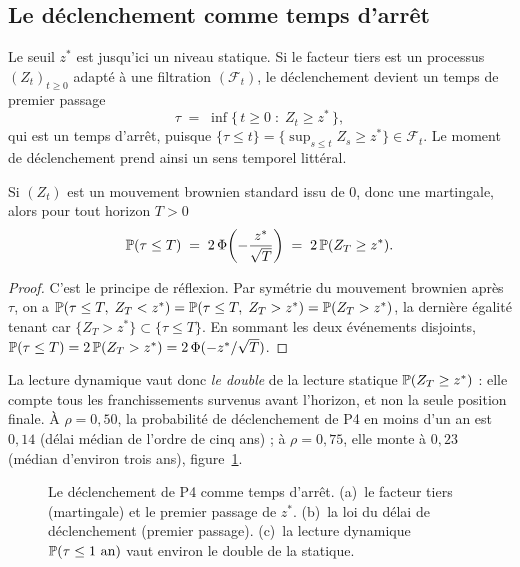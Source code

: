 \subsection{Le déclenchement comme temps d'arrêt}
\label{sec:p4-dynamique}

Le seuil $z^*$ est jusqu'ici un niveau statique. Si le facteur tiers est un processus
$(Z_t)_{t\ge0}$ adapté à une filtration $(\mathcal{F}_t)$, le déclenchement devient un
temps de premier passage
\begin{equation}
  \tau \;=\; \inf\{\,t\ge 0 \;:\; Z_t \ge z^*\,\},
  \label{eq:temps-arret}
\end{equation}
qui est un temps d'arrêt, puisque $\{\tau\le t\}=\{\sup_{s\le t}Z_s\ge z^*\}\in
\mathcal{F}_t$. Le \og{}moment\fg{} de déclenchement prend ainsi un sens temporel littéral.

\begin{proposition}\label{prop:premier-passage}
Si $(Z_t)$ est un mouvement brownien standard issu de $0$, donc une martingale, alors pour tout
horizon $T>0$
\begin{equation}
  \mathbb{P}(\tau\le T) \;=\; 2\,\Phi\!\left(-\frac{z^*}{\sqrt{T}}\right)
  \;=\; 2\,\mathbb{P}(Z_T\ge z^*).
  \label{eq:reflexion}
\end{equation}
\end{proposition}

\begin{proof}
C'est le principe de réflexion. Par symétrie du mouvement brownien après $\tau$, on a
$\mathbb{P}(\tau\le T,\;Z_T< z^*)=\mathbb{P}(\tau\le T,\;Z_T> z^*)=\mathbb{P}(Z_T>z^*)$, la dernière égalité
tenant car $\{Z_T>z^*\}\subset\{\tau\le T\}$. En sommant les deux événements disjoints,
$\mathbb{P}(\tau\le T)=2\,\mathbb{P}(Z_T>z^*)=2\,\Phi(-z^*/\sqrt{T})$.
\end{proof}

La lecture dynamique vaut donc \emph{le double} de la lecture statique $\mathbb{P}(Z_T\ge z^*)$ : elle
compte tous les franchissements survenus avant l'horizon, et non la seule position finale. À
$\rho=0{,}50$, la probabilité de déclenchement de P4 en moins d'un an est $0{,}14$ (délai médian
de l'ordre de cinq ans) ; à $\rho=0{,}75$, elle monte à $0{,}23$ (médian d'environ trois ans),
figure~\ref{fig:p4-dynamique}.

\begin{figure}[htbp]\centering
{}
\caption{Le déclenchement de P4 comme temps d'arrêt. (a)~le facteur tiers (martingale)
et le premier passage de $z^*$. (b)~la loi du délai de déclenchement (premier passage).
(c)~la lecture dynamique $\mathbb{P}(\tau\le 1\text{ an})$ vaut environ le double de la
statique.}
\label{fig:p4-dynamique}
\end{figure}

